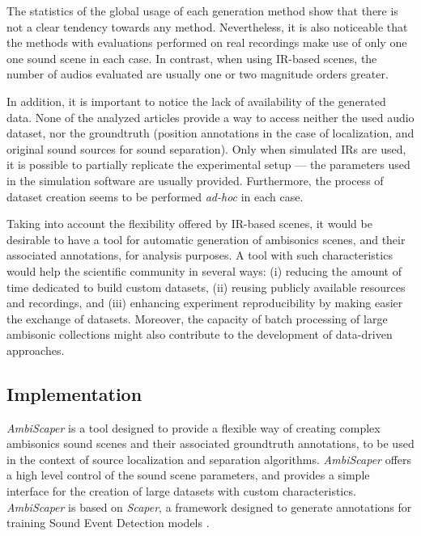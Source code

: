 The statistics of the global usage of each generation method show that there is not a clear tendency towards any method.
Nevertheless, it is also noticeable that the methods with evaluations performed on real recordings make use of only one one sound scene in each case. In contrast, when using IR-based scenes, the number of audios evaluated are usually one or two magnitude orders greater. 

In addition, it is important to notice the lack of availability of the generated data. None of the analyzed articles provide a way to access neither the used audio dataset, nor the groundtruth (position annotations in the case of localization, and original sound sources for sound separation). 
Only when simulated IRs are used, it is possible to partially replicate the experimental setup --- the parameters used in the simulation software are usually provided. 
Furthermore, the process of dataset creation seems to be performed \textit{ad-hoc} in each case. 

Taking into account the flexibility offered by IR-based scenes, it would be desirable to have a tool for automatic generation of ambisonics scenes, and their associated annotations, for analysis purposes.
A tool with such characteristics would help the scientific community in several ways: (i) reducing the amount of time dedicated to build custom datasets, (ii) reusing publicly available resources and recordings, and (iii) enhancing experiment reproducibility by making easier the exchange of datasets. 
Moreover, the capacity of batch processing of large ambisonic collections might also contribute to the development of data-driven approaches.


\subsection{Implementation}
\label{sec:ambiscaper}

\textit{AmbiScaper} is a tool designed to provide a flexible way of creating complex ambisonics sound scenes and their associated groundtruth annotations, to be used in the context of source localization and separation algorithms.
\textit{AmbiScaper} offers a high level control of the sound scene parameters, and provides a simple interface for the creation of large datasets with custom characteristics.
\textit{AmbiScaper} is based on \textit{Scaper}, a framework designed to generate annotations for training Sound Event Detection models \cite{Salamon2017}.\\

